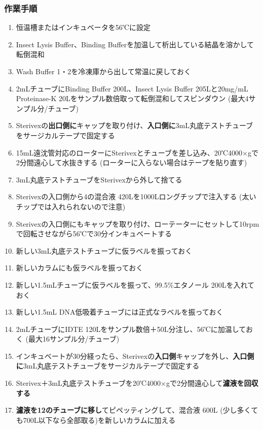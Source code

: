 \documentclass[titlepage,10pt,a4paper]{jsbook}
\begin{document}
\subsubsection{作業手順}
\begin{enumerate}
\item 恒温槽またはインキュベータを56℃に設定
\item Insect Lysis Buffer、Binding Bufferを加温して析出している結晶を溶かして転倒混和
\item Wash Buffer 1・2を冷凍庫から出して常温に戻しておく
\item 2mLチューブにBinding Buffer 200{\textmu}L、Insect Lysis Buffer 205{\textmu}Lと20mg/mL Proteinase-K 20{\textmu}Lをサンプル数倍取って転倒混和してスピンダウン (最大4サンプル分/チューブ)
\item Sterivexの\textbf{出口側に}キャップを取り付け、\textbf{入口側に}3mL丸底テストチューブをサージカルテープで固定する
\item 15mL遠沈管対応のローターにSterivexとチューブを差し込み、20℃4000×gで2分間遠心して水抜きする (ローターに入らない場合はテープを貼り直す)
\item 3mL丸底テストチューブをSterivexから外して捨てる
\item Sterivexの入口側から4の混合液 420{\textmu}Lを1000{\textmu}Lロングチップで注入する (太いチップでは入れられないので注意)
\item Sterivexの入口側にもキャップを取り付け、ローテーターにセットして10rpmで回転させながら56℃で30分インキュベートする
\item 新しい3mL丸底テストチューブに仮ラベルを振っておく
\item 新しいカラムにも仮ラベルを振っておく
\item 新しい1.5mLチューブに仮ラベルを振って、99.5\%エタノール 200{\textmu}Lを入れておく
\item 新しい1.5mL DNA低吸着チューブには正式なラベルを振っておく
\item 2mLチューブにIDTE 120{\textmu}Lをサンプル数倍＋50{\textmu}L分注し、56℃に加温しておく (最大16サンプル分/チューブ)
\item インキュベートが30分経ったら、Sterivexの\textbf{入口側}キャップを外し、\textbf{入口側に}3mL丸底テストチューブをサージカルテープで固定する
\item Sterivex＋3mL丸底テストチューブを20℃4000×gで2分間遠心して\textbf{濾液を回収する}
\item \textbf{濾液を12のチューブに移し}てピペッティングして、混合液 600{\textmu}L (少し多くても700{\textmu}L以下なら全部取る)を新しいカラムに加える

\end{enumerate}
\end{document}
